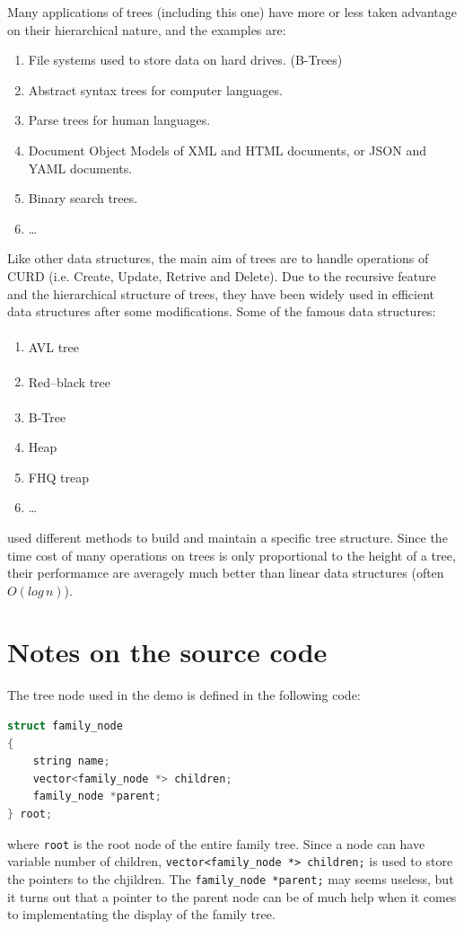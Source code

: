 \documentclass[cn,black,12pt,normal]{elegantnote}
\newcommand{\uct}[1]{\textsuperscript{\textsuperscript{\cite{#1}}}}
\begin{document}
Many applications of trees (including this one) have more or less taken advantage on their hierarchical nature, and the examples are:
\begin{enumerate}
    \item File systems used to store data on hard drives. (B-Trees)
    \item Abstract syntax trees for computer languages.
    \item Parse trees for human languages.
    \item Document Object Models of XML and HTML documents, or JSON and YAML documents.
    \item Binary search trees.
    \item \dots
\end{enumerate}

Like other data structures, the main aim of trees are to handle operations of CURD (i.e. Create, Update, Retrive and Delete). Due to the recursive feature and the hierarchical structure of trees, they have been widely used in efficient data structures after some modifications. Some of the famous data structures:
\begin{enumerate}
    \item AVL tree\uct{sedgewick1983balanced}
    \item Red–black tree\uct{bayer1972symmetric}
    \item B-Tree\uct{luo2011organization}
    \item Heap
    \item FHQ treap
    \item \dots
\end{enumerate}
used different methods to build and maintain a specific tree structure. Since the time cost of many operations on trees is only proportional to the height of a tree, their performamce are averagely much better than linear data structures (often $O(log\,n)$).

\section{Notes on the source code}

The tree node used in the demo is defined in the following code:
\begin{lstlisting}[language = C++]
struct family_node
{
	string name;
	vector<family_node *> children;
	family_node *parent;
} root;
\end{lstlisting}
where \lstinline{root} is the root node of the entire family tree. Since a node can have variable number of children, \lstinline{vector<family_node *> children;} is used to store the pointers to the chjildren. The \lstinline{family_node *parent;} may seems useless, but it turns out that a pointer to the parent node can be of much help when it comes to implementating the display of the family tree. 
\end{document}
